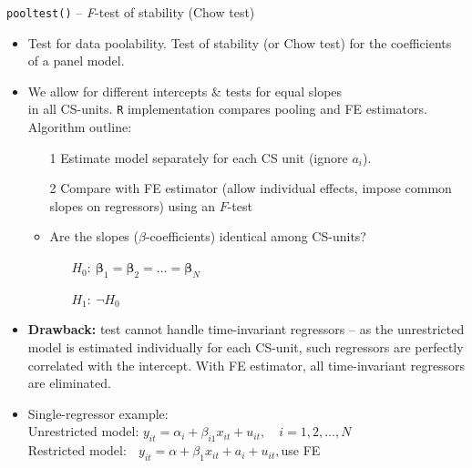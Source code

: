 \documentclass[usenames,dvipsnames]{beamer}
\begin{document}
\begin{frame}{\texttt{pooltest()} -- \textit{F}-test of stability (Chow test)}
\footnotesize
\begin{itemize}
    \item Test for data poolability. Test of stability (or Chow test) for the coefficients of a panel model.  
    \item We allow for different intercepts \& tests for equal slopes \\in all CS-units. \texttt{R} implementation compares pooling and FE estimators. Algorithm outline:
    \begin{itemize}
        \item[1] Estimate model separately for each CS unit (ignore $a_i$).
        \item[2] Compare with FE estimator (allow individual effects, impose common slopes on regressors) using an $F$-test 
        \item Are the slopes ($\beta$-coefficients) identical among CS-units?
        \begin{itemize}
    \item[] $H_0:~\bm{\beta}_{1}=\bm{\beta}_{2}=\dots=\bm{\beta}_{N}$  
    \item[] $H_1:~\neg H_0$
\end{itemize}
    \end{itemize}
    \smallskip
    \item \textbf{Drawback:} test cannot handle time-invariant regressors -- as the unrestricted model is estimated individually for each CS-unit, such regressors are perfectly correlated with the intercept. With FE estimator, all time-invariant regressors are eliminated. 
    \medskip
    \item Single-regressor example:\\ \medskip Unrestricted model: $y_{it} = \alpha_i + \beta_{i1} x_{it} + u_{it}, \quad i=1,2,\dots,N$\\ \smallskip Restricted model: $\,~~y_{it} = \alpha + \beta_1 x_{it} + a_i + u_{it},$\quad use FE
\end{itemize}
\end{frame}
\end{document}
